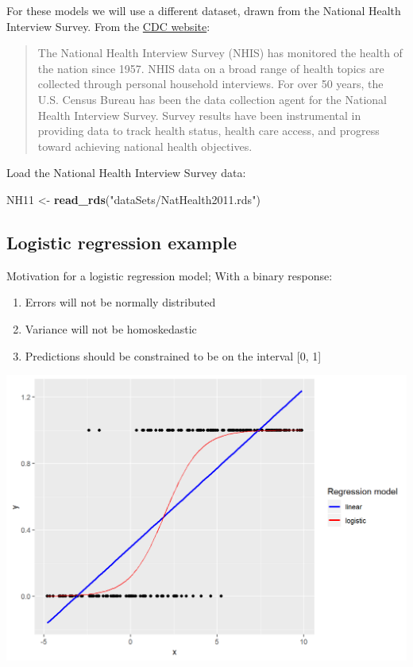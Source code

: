 \documentclass[]{book}
\newenvironment{Shaded}{\begin{snugshade}}{\end{snugshade}}
\newcommand{\KeywordTok}[1]{\textcolor[rgb]{0.13,0.29,0.53}{\textbf{#1}}}
\newcommand{\NormalTok}[1]{#1}
\newcommand{\StringTok}[1]{\textcolor[rgb]{0.31,0.60,0.02}{#1}}
\providecommand{\tightlist}{%
  \setlength{\itemsep}{0pt}\setlength{\parskip}{0pt}}
\begin{document}
For these models we will use a different dataset, drawn from the National Health Interview Survey. From the \href{http://www.cdc.gov/nchs/nhis.htm}{CDC website}:

\begin{quote}
The National Health Interview Survey (NHIS) has monitored the health of the nation since 1957. NHIS data on a broad range of health topics are collected through personal household interviews. For over 50 years, the U.S. Census Bureau has been the data collection agent for the National Health Interview Survey. Survey results have been instrumental in providing data to track health status, health care access, and progress toward achieving national health objectives.
\end{quote}

Load the National Health Interview Survey data:

\begin{Shaded}
\begin{Highlighting}[]
\NormalTok{  NH11 <-}\StringTok{ }\KeywordTok{read_rds}\NormalTok{(}\StringTok{"dataSets/NatHealth2011.rds"}\NormalTok{)}
\end{Highlighting}
\end{Shaded}

\hypertarget{logistic-regression-example}{%
\subsection{Logistic regression example}\label{logistic-regression-example}}

Motivation for a logistic regression model; With a binary response:

\begin{enumerate}
\def\labelenumi{\arabic{enumi}.}
\tightlist
\item
  Errors will not be normally distributed
\item
  Variance will not be homoskedastic
\item
  Predictions should be constrained to be on the interval {[}0, 1{]}
\end{enumerate}

\includegraphics{R/Rmodels/images/logistic.png}
\end{document}
